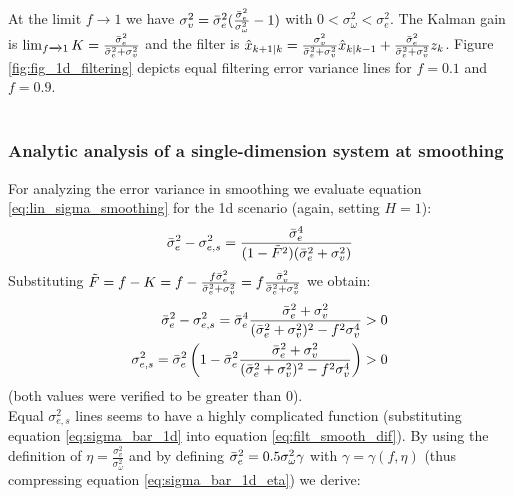 \documentclass[oneside,12pt]{article}
\begin{document}
%
At the limit $f \xrightarrow{} 1$ we have $\sigma_v^2 = \Bar{\sigma}_e^2(\frac{\Bar{\sigma}_e^2}{\sigma_\omega^2} - 1)$ with $0 < \sigma_\omega^2 < \sigma_e^2$. The Kalman gain is $\operatorname{lim}_{f \xrightarrow{} 1} K = \frac{\Bar{\sigma}_e^2}{\Bar{\sigma}_e^2 + \sigma_v^2}$ and the filter is $\hat{x}_{k+1 \mid k} = \frac{\sigma_v^2}{\Bar{\sigma}_e^2 + \sigma_v^2}\hat{x}_{k \mid k-1} + \frac{\Bar{\sigma}_e^2}{\Bar{\sigma}_e^2 + \sigma_v^2}z_k$. Figure \ref{fig:fig_1d_filtering} depicts equal filtering error variance lines for $f=0.1$ and $f=0.9$.\\\\
%
\subsubsection{Analytic analysis of a single-dimension system at smoothing}
For analyzing the error variance in smoothing we evaluate equation \ref{eq:lin_sigma_smoothing} for the 1d scenario (again, setting $H=1$):
%
\begin{equation}\label{eq:smoothing_imp}
    \begin{split}
        \Bar{\sigma}_e^2 - \sigma_{e,s}^2 &= \frac{\Bar{\sigma}_e^4}{(1 - {\tilde{F}}^2)(\Bar{\sigma}_e^2 + \sigma_v^2)}\\
    \end{split}
\end{equation}
%
Substituting $\tilde{F} = f - K = f - \frac{f\Bar{\sigma}_e^2}{\Bar{\sigma}_e^2 + \sigma_v^2}=f \frac{\Bar{\sigma}_v^2}{\Bar{\sigma}_e^2 + \sigma_v^2}$ we obtain:
%
\begin{equation}\label{eq:filt_smooth_dif}
    \begin{split}
        \Bar{\sigma}_e^2 - \sigma_{e,s}^2 = \Bar{\sigma}_e^4 \frac{\Bar{\sigma}_e^2 + \sigma_v^2}{(\Bar{\sigma}_e^2 + \sigma_v^2)^2 - f^2 \sigma_v^4} > 0\\
        \sigma_{e,s}^2 = \Bar{\sigma}_e^2\left(1 - \Bar{\sigma}_e^2 \frac{\Bar{\sigma}_e^2 + \sigma_v^2}{(\Bar{\sigma}_e^2 + \sigma_v^2)^2 - f^2 \sigma_v^4}\right) > 0\\
    \end{split}
\end{equation}
(both values were verified to be greater than 0).\\
Equal $\sigma_{e,s}^2$ lines seems to have a highly complicated function (substituting equation \ref{eq:sigma_bar_1d} into equation \ref{eq:filt_smooth_dif}). By using the definition of $\eta = \frac{\sigma_v^2}{\sigma_\omega^2}$ and by defining $\Bar{\sigma}_e^2 = 0.5 \sigma_\omega^2\gamma$ with $\gamma = \gamma(f,\eta)$ (thus compressing equation \ref{eq:sigma_bar_1d_eta}) we derive:
\end{document}
